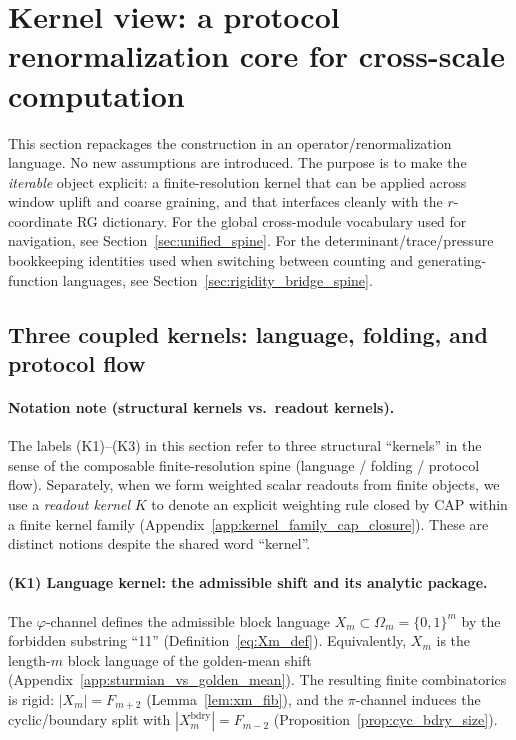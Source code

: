\section{Kernel view: a protocol renormalization core for cross-scale computation}
\label{sec:kernel_view}

This section repackages the construction in an operator/renormalization language.
No new assumptions are introduced.
The purpose is to make the \emph{iterable} object explicit: a finite-resolution kernel that can be applied across window uplift and coarse graining, and that interfaces cleanly with the $r$-coordinate RG dictionary.
\AuditTag For the global cross-module vocabulary used for navigation, see Section~\ref{sec:unified_spine}.
\AuditTag For the determinant/trace/pressure bookkeeping identities used when switching between counting and generating-function languages, see Section~\ref{sec:rigidity_bridge_spine}.

\subsection{Three coupled kernels: language, folding, and protocol flow}
\label{subsec:three_kernels}

\paragraph{Notation note (structural kernels vs.\ readout kernels).}
\AuditTag The labels (K1)--(K3) in this section refer to three structural ``kernels'' in the sense of the composable finite-resolution spine (language / folding / protocol flow).
Separately, when we form weighted scalar readouts from finite objects, we use a \emph{readout kernel} $K$ to denote an explicit weighting rule closed by CAP within a finite kernel family (Appendix~\ref{app:kernel_family_cap_closure}).
These are distinct notions despite the shared word ``kernel''.

\paragraph{(K1) Language kernel: the admissible shift and its analytic package.}
The $\varphi$-channel defines the admissible block language
$X_m\subset\Omega_m=\{0,1\}^m$ by the forbidden substring ``11'' (Definition~\eqref{eq:Xm_def}).
Equivalently, $X_m$ is the length-$m$ block language of the golden-mean shift (Appendix~\ref{app:sturmian_vs_golden_mean}).
The resulting finite combinatorics is rigid:
$|X_m|=F_{m+2}$ (Lemma~\ref{lem:xm_fib}), and the $\pi$-channel induces the cyclic/boundary split with $|X_m^{\mathrm{bdry}}|=F_{m-2}$ (Proposition~\ref{prop:cyc_bdry_size}).

